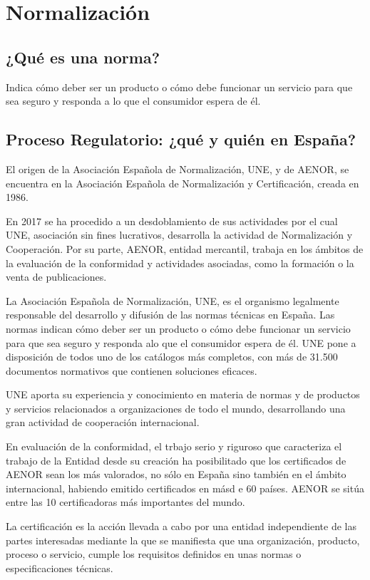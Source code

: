 \chapter{Normalización}
\section{¿Qué es una norma?}
Indica cómo deber ser un producto o cómo debe funcionar un servicio para que sea seguro y responda a lo que el consumidor espera de él.

\section{Proceso Regulatorio: ¿qué y quién en España?}
El origen de la Asociación Española de Normalización, UNE, y de AENOR, se encuentra en la Asociación Española de Normalización y Certificación, creada en 1986.

En 2017 se ha procedido a un desdoblamiento de sus actividades por el cual UNE, asociación sin fines lucrativos, desarrolla la actividad de Normalización y Cooperación. Por su parte, AENOR, entidad mercantil, trabaja en los ámbitos de la evaluación de la conformidad y actividades asociadas, como la formación o la venta de publicaciones.

La Asociación Española de Normalización, UNE, es el organismo legalmente responsable del desarrollo y difusión de las normas técnicas en España. Las normas indican cómo deber ser un producto o cómo debe funcionar un servicio para que sea seguro y responda  alo que el consumidor espera de él. UNE pone a disposición de todos uno de los catálogos más completos, con más de 31.500 documentos normativos que contienen soluciones eficaces.

UNE aporta su experiencia y conocimiento en materia de normas y de productos y servicios relacionados a organizaciones de todo el mundo, desarrollando una gran actividad de cooperación internacional.

En evaluación de la conformidad, el trbajo serio y riguroso que caracteriza el trabajo de la Entidad desde su creación ha posibilitado que los certificados de AENOR sean los más valorados, no sólo en España sino también en el ámbito internacional, habiendo emitido certificados en másd e 60 países. AENOR se sitúa entre las 10 certificadoras más importantes del mundo.

La certificación es la acción llevada a cabo por una entidad independiente de las partes interesadas mediante la que se manifiesta que una organización, producto, proceso o servicio, cumple los requisitos definidos en unas normas o especificaciones técnicas.


